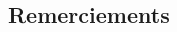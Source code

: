 \begin{center}
\subsection*{Remerciements}
\end{center}

\hskip7mm

\begin{spacing}{1.3}

\vspace{5mm}


\vspace{5mm}


\vspace{5mm}


\end{spacing}